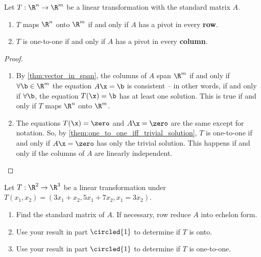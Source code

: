 \begin{theorem}
  \label{thm:ways_to_determine_onto_or_one_to_one}

  Let $T : \R^n \to \R^m$ be a linear transformation with the standard matrix
  $A$.

  \begin{enumerate}
    \label{enum:ways_to_determine_onto_or_one_to_one}

    \item $T$ maps $\R^n$ onto $\R^m$ if and only if $A$ has a pivot in every
      \textbf{row}.

    \item $T$ is one-to-one if and only if $A$ has a pivot in every
      \textbf{column}.
  \end{enumerate}
\end{theorem}

\begin{proof}
  \label{prf:ways_to_determine_onto_or_one_to_one} $ $

  \begin{enumerate}
    \label{enum:ways_to_determine_onto_or_one_to_one_prf}

    \item By \cref{thm:vector_in_span}, the columns of $A$ span $\R^m$ if and
      only if $\forall \b \in \R^m$ the equation $A\x = \b$ is consistent -- in
      other words, if and only if $\forall \b$, the equation $T(\x) = \b$ has at
      least one solution. This is true if and only if $T$ maps $\R^n$ onto
      $\R^m$.

    \item The equations $T(\x) = \zero$ and $A\x = \zero$ are the same except
      for notation. So, by \cref{them:one_to_one_iff_trivial_solution}, $T$ is
      one-to-one if and only if $A\x = \zero$ has only the trivial solution.
      This happens if and only if the columns of $A$ are linearly independent.
      \qedhere
  \end{enumerate}
\end{proof}

\begin{question}
  \label{qst:onto_or_one_to_one_2}

  Let $T : \R^2 \to \R^3$ be a linear transformation under
  $T(x_1, x_2) = (3x_1 + x_2, 5x_1 + 7x_2, x_1 = 3x_2)$.
  \begin{enumerate}
    \label{enum:onto_or_one_to_one_2_qst}

    \item Find the standard matrix of $A$. If necessary, row reduce $A$ into
      echelon form.

    \item Use your result in part $\circled{1}$ to determine if $T$ is onto.

    \item Use your result in part $\circled{1}$ to determine if $T$ is
      one-to-one.
  \end{enumerate}
\end{question}

